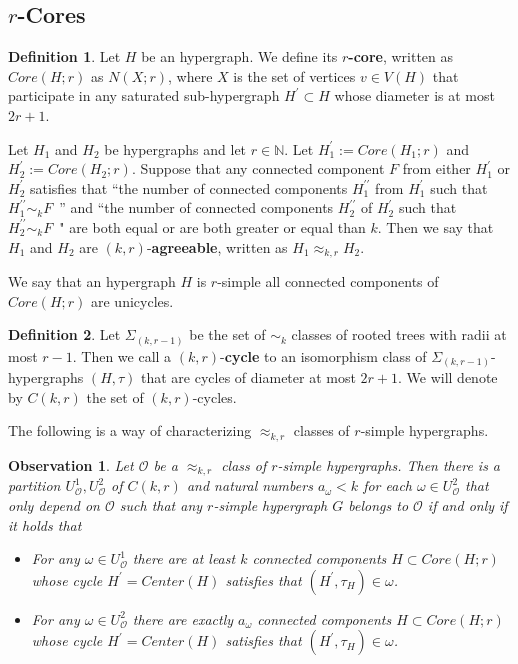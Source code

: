 \documentclass[12pt,notitlepage,a4paper]{article}
\newtheorem{obs}{Observation}[section]
\theoremstyle{definition}
\newtheorem{definition}{Definition}[section]
\newcommand{\N}{\mathbb{N}}
\begin{document}
\subsection{$r$-Cores}

\begin{definition}
	Let $H$ be an hypergraph. We define its \textbf{$r$-core}, 
	written as $Core(H;r)$ as $N(X;r)$,
	where $X$ is the set of vertices $v\in V(H)$
	that participate in any saturated sub-hypergraph 
	$H^\prime\subset H$ whose diameter is at most $2r+1$.\par
	Let $H_1$ and $H_2$ be hypergraphs and let $r\in \N$.
	Let $H^\prime_1:=Core(H_1;r)$ and $H^\prime_2:=Core(H_2;r)$. 
	Suppose that any connected component $F$ from either 
	$H^\prime_1$ or $H^\prime_2$ satisfies that
	``the number of connected components $H^{\prime\prime}_1$
	from $H^\prime_1$ such that $ H^{\prime\prime}_1 \sim_k F\, \, \,$'' 
	and ``the number of
	connected components $H^{\prime \prime}_2$ of $H^\prime_2$
	such that
	$ H^{\prime\prime}_2\sim_k F\, \, \,$" 
	are both equal or are both greater 
	or equal than $k$. Then we say that $H_1$ and $H_2$
	are $(k,r)$-\textbf{agreeable}, written as $H_1\approx_{k,r} H_2$. \par
	We say that an hypergraph $H$ is $r$-simple all connected components
	of $Core(H;r)$ are unicycles.   
\end{definition}



\begin{definition}
	Let $\Sigma_{(k,r-1)}$ be the set of $\sim_k$ classes
	of rooted trees with radii at most $r-1$. Then
	we call a $(k,r)$-\textbf{cycle} to an isomorphism class
	of $\Sigma_{(k,r-1)}$-hypergraphs 
	$(H,\tau)$ that are cycles of diameter at most $2r+1$.
	We will denote by $C(k,r)$ the set of $(k,r)$-cycles.
\end{definition}

The following is a way of characterizing $\approx_{k,r}$ classes
of $r$-simple hypergraphs.


\begin{obs}\label{obs:agreeablecores}
	Let $\mathcal{O}$ be a $\approx_{k,r}$ class
	of $r$-simple hypergraphs. 
	Then there is a partition $U^1_\mathcal{O},
	U^2_\mathcal{O}$ of $C(k,r)$ and natural numbers $a_\omega<k$
	for each $\omega\in U^2_\mathcal{O}$ that only depend on 
	$\mathcal{O}$ such that any $r$-simple hypergraph $G$ belongs to
	$\mathcal{O}$ if and only if it holds that
	\begin{itemize}
		\item[(1)] For any $\omega\in U^1_\mathcal{O}$ there are at least
		$k$ connected components $H \subset Core(H;r)$ whose cycle 		
		$H^\prime=Center(H)$ satisfies that
		$(H^{\prime},\tau_{H})\in \omega$.
		\item[(2)]For any $\omega\in U^2_\mathcal{O}$ there are exactly 
		$a_\omega$ connected components $H \subset Core(H;r)$ whose cycle 		
		$H^\prime=Center(H)$ satisfies that
		$(H^{\prime},\tau_{H})\in \omega$.	
	\end{itemize}
\end{obs}
\end{document}
